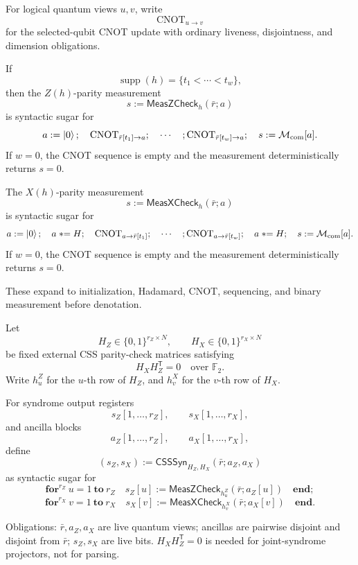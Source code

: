 \documentclass[acmsmall,screen,review,anonymous,nonacm]{acmart}
\theoremstyle{defn_style}
\newcommand{\asteq}{\mathrel{*}=}
\begin{document}
\begin{itemize}
    For logical quantum views \(u,v\), write
    \[
    \operatorname{CNOT}_{u\rightarrow v}
    \]
    for the selected-qubit CNOT update with ordinary liveness, disjointness,
    and dimension obligations.
    
    If
    \[
    \operatorname{supp}(h)=\{t_1<\cdots<t_w\},
    \]
    then the \(Z(h)\)-parity measurement
    \[
    s:=\mathsf{MeasZCheck}_{h}(\bar r;a)
    \]
    is syntactic sugar for
    \[
    a:=\ket0;
    \quad
    \operatorname{CNOT}_{\bar r[t_1]\rightarrow a};
    \quad\cdots\quad;
    \operatorname{CNOT}_{\bar r[t_w]\rightarrow a};
    \quad
    s:=\mathcal M_{\mathrm{com}}[a].
    \]
    If \(w=0\), the CNOT sequence is empty and the measurement deterministically
    returns \(s=0\).
    
    The \(X(h)\)-parity measurement
    \[
    s:=\mathsf{MeasXCheck}_{h}(\bar r;a)
    \]
    is syntactic sugar for
    \[
    a:=\ket0;
    \quad
    a\asteq H;
    \quad
    \operatorname{CNOT}_{a\rightarrow \bar r[t_1]};
    \quad\cdots\quad;
    \operatorname{CNOT}_{a\rightarrow \bar r[t_w]};
    \quad
    a\asteq H;
    \quad
    s:=\mathcal M_{\mathrm{com}}[a].
    \]
    If \(w=0\), the CNOT sequence is empty and the measurement deterministically
    returns \(s=0\).
    
    These expand to initialization, Hadamard, CNOT, sequencing, and binary
    measurement before denotation.
    
    Let
    \[
    H_Z\in\{0,1\}^{r_Z\times N},
    \qquad
    H_X\in\{0,1\}^{r_X\times N}
    \]
    be fixed external CSS parity-check matrices satisfying
    \[
    H_XH_Z^{\mathsf T}=0
    \quad\text{over }\mathbb F_2.
    \]
    Write \(h^Z_u\) for the \(u\)-th row of \(H_Z\), and \(h^X_v\) for the
    \(v\)-th row of \(H_X\).
    
    For syndrome output registers
    \[
    s_Z[1,\ldots,r_Z],
    \qquad
    s_X[1,\ldots,r_X],
    \]
    and ancilla blocks
    \[
    a_Z[1,\ldots,r_Z],
    \qquad
    a_X[1,\ldots,r_X],
    \]
    define
    \[
    (s_Z,s_X):=
    \mathsf{CSSSyn}_{H_Z,H_X}(\bar r;a_Z,a_X)
    \]
    as syntactic sugar for
    \[
    \mathbf{for}^{r_Z}\ u=1\ \mathbf{to}\ r_Z
    \quad
    s_Z[u]:=\mathsf{MeasZCheck}_{h^Z_u}(\bar r;a_Z[u])
    \quad
    \mathbf{end};
    \]
    \[
    \mathbf{for}^{r_X}\ v=1\ \mathbf{to}\ r_X
    \quad
    s_X[v]:=\mathsf{MeasXCheck}_{h^X_v}(\bar r;a_X[v])
    \quad
    \mathbf{end}.
    \]
    
    Obligations: \(\bar r,a_Z,a_X\) are live quantum views; ancillas are
    pairwise disjoint and disjoint from \(\bar r\); \(s_Z,s_X\) are live bits.
    \(H_XH_Z^{\mathsf T}=0\) is needed for joint-syndrome projectors, not for
    parsing.
    


\end{itemize}
\end{document}
